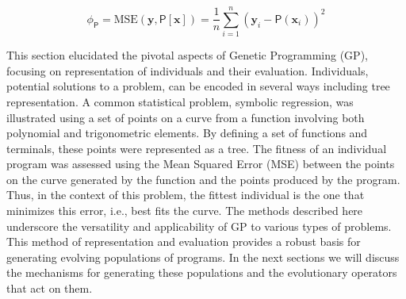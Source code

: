   \begin{equation}
  \label{eq:genetic_programming:representation:fitness}
    \phi_\mathsf{P} = \mathrm{MSE}(\mathbf{y}, \mathsf{P}[\mathbf{x}])
      = \frac{1}{n} \sum_{i=1}^{n} (\mathbf{y}_i - \mathsf{P}(\mathbf{x}_i))^2
  \end{equation}

  This section elucidated the pivotal aspects of Genetic Programming (GP), 
  focusing on representation of individuals and their evaluation.
  Individuals, potential solutions to a problem, can be encoded in several ways
  including tree representation.
  A common statistical problem, symbolic regression, was illustrated using a set
  of points on a curve from a function involving both polynomial and
  trigonometric elements.
  By defining a set of functions and terminals, these points were represented as
  a tree.
  The fitness of an individual program was assessed using the Mean Squared Error
  (MSE) between the points on the curve generated by the function and the points
  produced by the program.
  Thus, in the context of this problem, the fittest individual is the one that
  minimizes this error, i.e., best fits the curve.
  The methods described here underscore the versatility and applicability of GP
  to various types of problems.
  This method of representation and evaluation provides a robust basis for
  generating evolving populations of programs. 
  In the next sections we will discuss the mechanisms for generating these
  populations and the evolutionary operators that act on them.
